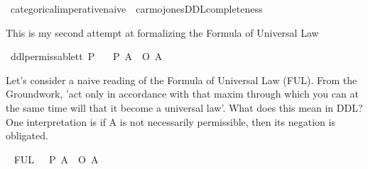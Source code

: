 %
\begin{isabellebody}%
%
%
\isadelimtheory
%
\endisadelimtheory
%
\isatagtheory
{}\isamarkupfalse%
\ categorical{\isacharunderscore}imperative{\isacharunderscore}naive\ \ carmojones{\isacharunderscore}DDL{\isacharunderscore}completeness\isanewline
\isanewline
{}%
\endisatagtheory
{\isafoldtheory}%
%
\isadelimtheory
%
\endisadelimtheory
%
\isadelimdocument
%
\endisadelimdocument
%
\isatagdocument
%
\isamarkuptrue%
%
\isamarkuptrue%
%
\endisatagdocument
{\isafolddocument}%
%
\isadelimdocument
%
\endisadelimdocument
%
\begin{isamarkuptext}%
This is my second attempt at formalizing the Formula of Universal Law%
\end{isamarkuptext}\isamarkuptrue%
\isamarkupfalse%
\ ddlpermissable{\isacharcolon}{\isacharcolon}{\isachardoublequoteopen}t{\isasymRightarrow}t{\isachardoublequoteclose}\ {\isacharparenleft}{\isachardoublequoteopen}P{\isacharunderscore}{\isachardoublequoteclose}{\isacharparenright}\isanewline
\ \ \ {\isachardoublequoteopen}{\isacharparenleft}P\ A{\isacharparenright}\ {\isasymequiv}\ {\isacharparenleft}\isactrlbold {\isasymnot}{\isacharparenleft}O\ {\isacharbraceleft}\isactrlbold {\isasymnot}A{\isacharbraceright}{\isacharparenright}{\isacharparenright}{\isachardoublequoteclose}\isanewline
%
\isanewline
%
\isanewline
%
\isanewline
%
%
\begin{isamarkuptext}%
Let's consider a naive reading of the Formula of Universal Law (FUL).
From the Groundwork, 'act only in accordance with that maxim through which you can at the same time will that it become a universal law'.
What does this mean in DDL? One interpretation is if A is not necessarily permissible, then its negation is obligated.%
\end{isamarkuptext}\isamarkuptrue%
\isamarkupfalse%
\ \isanewline
FUL{\isacharunderscore}{}{\isacharcolon}\ {\isachardoublequoteopen}{\isasymTurnstile}\ {\isacharparenleft}{\isacharparenleft}\isactrlbold {\isasymnot}{\isacharparenleft}{\isasymbox}\ {\isacharparenleft}P\ A{\isacharparenright}{\isacharparenright}{\isacharparenright}\ \isactrlbold {\isasymrightarrow}\ {\isacharparenleft}O\ {\isacharbraceleft}{\isacharparenleft}\isactrlbold {\isasymnot}A{\isacharparenright}{\isacharbraceright}{\isacharparenright}{\isacharparenright}{\isachardoublequoteclose}\isanewline

\end{isabellebody}
